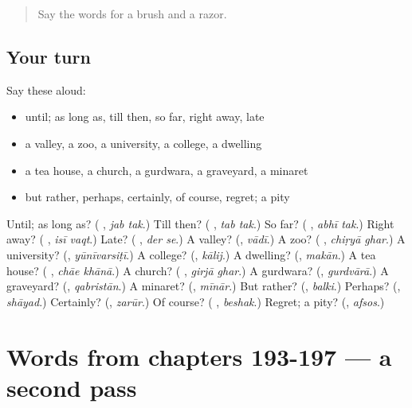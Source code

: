 \begin{quote}
Say the words for a brush and a razor.
\end{quote}

\subsection*{Your turn}
Say these aloud:

\begin{itemize}
\raggedright
  \item until; as long as, till then, so far, right away, late
  \item a valley, a zoo, a university, a college, a dwelling
  \item a tea house, a church, a gurdwara, a graveyard, a minaret
  \item but rather, perhaps, certainly, of course, regret; a pity
\end{itemize}

\begin{tcolorbox}[breakable,colback=teal!4,colframe=teal!35!black,title={Before you move on}]
Until; as long as? (\textbf{ }, \emph{jab tak}.) Till then? (\textbf{ }, \emph{tab tak}.) So far? (\textbf{ }, \emph{abhī tak}.) Right away? (\textbf{ }, \emph{isī vaqt}.) Late? (\textbf{ }, \emph{der se}.) A valley? (\textbf{}, \emph{vādī}.) A zoo? (\textbf{ }, \emph{chiṛyā ghar}.) A university? (\textbf{}, \emph{yūnīvarsiṭī}.) A college? (\textbf{}, \emph{kālij}.) A dwelling? (\textbf{}, \emph{makān}.) A tea house? (\textbf{ }, \emph{chāe khānā}.) A church? (\textbf{ }, \emph{girjā ghar}.) A gurdwara? (\textbf{}, \emph{gurdvārā}.) A graveyard? (\textbf{}, \emph{qabristān}.) A minaret? (\textbf{}, \emph{mīnār}.) But rather? (\textbf{}, \emph{balki}.) Perhaps? (\textbf{}, \emph{shāyad}.) Certainly? (\textbf{}, \emph{zarūr}.) Of course? (\textbf{ }, \emph{beshak}.) Regret; a pity? (\textbf{}, \emph{afsos}.)
\end{tcolorbox}
\section[(dialogue)]{Words from chapters 193-197 — a second pass}

\label{lesson:UR-R197-second-pass-words-from-chapters-193-197}




